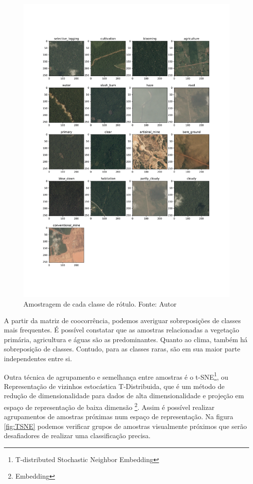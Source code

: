 \begin{figure}[!ht]
    \centering
    \includegraphics[width=\columnwidth]{Imagens/results/rsp-resnet-50_planet_pt/Amostras de cada classe.pdf}
    \caption{Amostragem de cada classe de rótulo.
    Fonte: Autor}
   \label{fig:classes}
\end{figure}




A partir da matriz de coocorrência, podemos averiguar sobreposições de classes mais frequentes. É possível constatar que as amostras relacionadas a vegetação primária, agricultura e águas são as predominantes. Quanto ao clima, também há sobreposição de classes. Contudo, para as classes raras, são em sua maior parte independentes entre si.

Outra técnica de agrupamento e semelhança entre amostras é o t-SNE\footnote[5]{T-distributed Stochastic Neighbor Embedding}, ou Representação de vizinhos estocástica T-Distribuida, que é um método de redução de dimensionalidade para dados de alta dimensionalidade e projeção em espaço de representação de baixa dimensão \footnote[6]{Embedding}. Assim é possível realizar agrupamentos de amostras próximas num espaço de representação. Na figura \ref{fig:TSNE} podemos verificar grupos de amostras visualmente próximos que serão desafiadores de realizar uma classificação precisa. \cite{JMLR:v9:vandermaaten08a}

